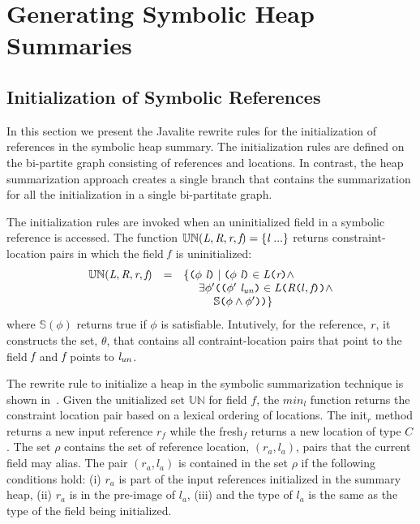 \section{Generating Symbolic Heap Summaries}

\subsection{Initialization of Symbolic References}

In this section we present the Javalite rewrite rules for the
initialization of references in the symbolic heap summary. The
initialization rules are defined on the bi-partite graph consisting of
references and locations. In contrast, the heap summarization approach
creates a single branch that contains the summarization for all the
initialization in a single bi-partitate graph.




The initialization rules are invoked when an uninitialized field in a
symbolic reference is accessed. The function $\mathbb{UN}(\emph{L},
\emph{R}, \emph{r}, \emph{f}) = \{\emph{l}\ ...\}$ returns
constraint-location pairs in which the field $\emph{f}$ is
uninitialized:
\[
\begin{array}{rcl}
\mathbb{UN}(\cfgnt{L}, \cfgnt{R}, \cfgnt{r}, \cfgnt{f}) & = &\{ \lp\phi\ \cfgnt{l}\rp \mid \lp \phi\ \cfgnt{l}\rp  \in \cfgnt{L}\lp \cfgnt{r}\rp  \wedge \\
& & \ \ \ \ \exists \phi^\prime \lp \lp \phi^\prime\ \cfgnt{l}_\mathit{un}\rp  \in \cfgnt{L}\lp \cfgnt{R}\lp l,\cfgnt{f}\rp\rp \wedge \\
& & \ \ \ \ \ \ \ \ \mathbb{S}\lp \phi \wedge \phi^\prime \rp\rp\}\\
\end{array}
\]
where $\mathbb{S}(\phi)$ returns true if $\phi$ is
satisfiable. Intutively, for the reference, $\emph{r}$, it constructs
the set, $\theta$, that contains all contraint-location pairs that
point to the field $\emph{f}$ and $\emph{f}$ points to
$\emph{l}_\mathit{un}$.


The rewrite rule to initialize a heap in the symbolic summarization
technique is shown in~. Given the unitialized set
$\mathbb{UN}$ for field $f$, the $\mathit{min}_l$ function returns the
constraint location pair based on a lexical ordering of locations. The
init$_r$ method returns a new input reference $r_f$ while the
fresh$_f$ returns a new location of type $C$. The set $\rho$ contains
the set of reference location, $(r_a, l_a)$, pairs that the current
field may alias. The pair $(r_a, l_a)$ is contained in the set $ \rho
$ if the following conditions hold: (i) $r_a$ is part of the input
references initialized in the summary heap, (ii) $r_a$ is in the
pre-image of $l_a$, (iii) and the type of $l_a$ is the same as the
type of the field being initialized.

